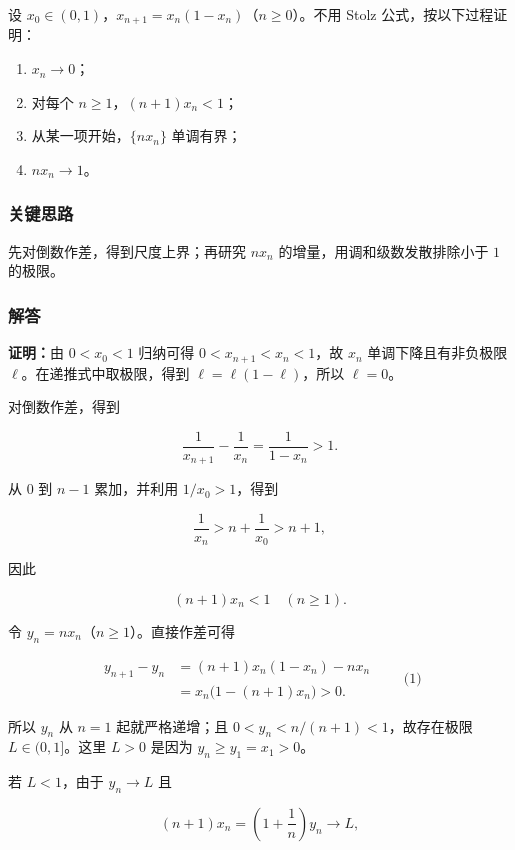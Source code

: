 \documentclass[11pt,a4paper]{article}
\providecommand{\tightlist}{\setlength{\itemsep}{3pt}\setlength{\parskip}{0pt}}
\begin{document}
设 \(x_0\in(0,1)\)，\(x_{n+1}=x_n(1-x_n)\)（\(n\ge0\)）。不用 Stolz
公式，按以下过程证明：

\begin{enumerate}
\def\labelenumi{\arabic{enumi}.}
\tightlist
\item
  \(x_n\to0\)；
\item
  对每个 \(n\ge1\)，\((n+1)x_n<1\)；
\item
  从某一项开始，\(\{nx_n\}\) 单调有界；
\item
  \(nx_n\to1\)。
\end{enumerate}

\subsubsection{关键思路}\label{ux5173ux952eux601dux8def}

先对倒数作差，得到尺度上界；再研究 \(nx_n\)
的增量，用调和级数发散排除小于 \(1\) 的极限。

\subsubsection{解答}\label{ux89e3ux7b54}

\textbf{证明：}由 \(0<x_0<1\) 归纳可得 \(0<x_{n+1}<x_n<1\)，故 \(x_n\)
单调下降且有非负极限 \(\ell\)。在递推式中取极限，得到
\(\ell=\ell(1-\ell)\)，所以 \(\ell=0\)。

对倒数作差，得到

\[
\frac1{x_{n+1}}-\frac1{x_n}
=\frac1{1-x_n}>1.
\]

从 \(0\) 到 \(n-1\) 累加，并利用 \(1/x_0>1\)，得到

\[
\frac1{x_n}>n+\frac1{x_0}>n+1,
\]

因此

\[
\boxed{(n+1)x_n<1\quad(n\ge1).}
\]

令 \(y_n=nx_n\)（\(n\ge1\)）。直接作差可得

\[
\begin{aligned}
y_{n+1}-y_n
&=(n+1)x_n(1-x_n)-nx_n\\
&=x_n\bigl(1-(n+1)x_n\bigr)>0.
\end{aligned}
\qquad\text{(1)}
\]

所以 \(y_n\) 从 \(n=1\) 起就严格递增；且 \(0<y_n<n/(n+1)<1\)，故存在极限
\(L\in(0,1]\)。这里 \(L>0\) 是因为 \(y_n\ge y_1=x_1>0\)。

若 \(L<1\)，由于 \(y_n\to L\) 且

\[
(n+1)x_n=\left(1+\frac1n\right)y_n\longrightarrow L,
\]
\end{document}
